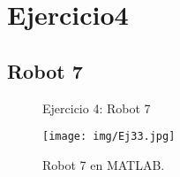 \section{\textbf{Ejercicio4}}
\subsection{\textbf{Robot 7}}

\begin{figure}[H]
	\centering
	\hfill
	\caption{Ejercicio 4: Robot 7}
	\label{fig:Robot7}
\end{figure}


\begin{figure}[H]
\centering
\texttt{[image: img/Ej33.jpg]}
\caption{Robot 7 en MATLAB.}
\label{fig:Robot7matlab}
\end{figure}